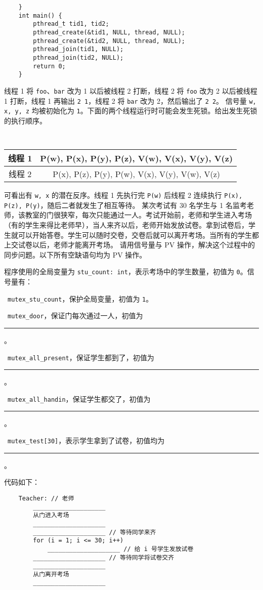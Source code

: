 \begin{problems}
\begin{verbatim}
    }
    int main() {
        pthread_t tid1, tid2;
        pthread_create(&tid1, NULL, thread, NULL);
        pthread_create(&tid2, NULL, thread, NULL);
        pthread_join(tid1, NULL);
        pthread_join(tid2, NULL);
        return 0;
    }
        \end{verbatim}
        \sol 线程 1 将 \verb|foo|、\verb|bar| 改为 1 以后被线程 2 打断，线程 2 将 \verb|foo| 改为 2 以后被线程 1 打断，线程 1 再输出 \verb|2 1|，线程 2 将 \verb|bar| 改为 2，然后输出了 \verb|2 2|。
        \pro 信号量 \verb|w, x, y, z| 均被初始化为 \verb|1|。下面的两个线程运行时可能会发生死锁。给出发生死锁的执行顺序。
        \begin{table}[H]
            \tt
            \centering
            \begin{tabular}{|c|c|}
                \hline
                线程 1 & P(w), P(x), P(y), P(z), V(w), V(x), V(y), V(z) \\ \hline
                线程 2 & P(x), P(z), P(y), P(w), V(x), V(y), V(w), V(z) \\ \hline
            \end{tabular}
        \end{table}
        \sol 可看出有 \verb|w, x| 的潜在反序。线程 1 先执行完 \verb|P(w)| 后线程 2 连续执行 \verb|P(x), P(z), P(y)|，随后二者就发生了相互等待。
        \pro 某次考试有 30 名学生与 1 名监考老师，该教室的门很狭窄，每次只能通过一人。考试开始前，老师和学生进入考场（有的学生来得比老师早），当人来齐以后，老师开始发放试卷。拿到试卷后，学生就可以开始答卷。学生可以随时交卷，交卷后就可以离开考场。当所有的学生都上交试卷以后，老师才能离开考场。
        请用信号量与 PV 操作，解决这个过程中的同步问题。以下所有空缺语句均为 PV 操作。

        程序使用的全局变量为 \verb|stu_count: int|，表示考场中的学生数量，初值为 \verb|0|。信号量有：
        \begin{compactitem}
            \item\ \verb|mutex_stu_count|，保护全局变量，初值为 \verb|1|。
            \item\ \verb|mutex_door|，保证门每次通过一人，初值为 \rule{2.5cm}{0.25mm}。
            \item\ \verb|mutex_all_present|，保证学生都到了，初值为 \rule{2.5cm}{0.25mm}。
            \item\ \verb|mutex_all_handin|，保证学生都交了，初值为 \rule{2.5cm}{0.25mm}。
            \item\ \verb|mutex_test[30]|，表示学生拿到了试卷，初值均为 \rule{2.5cm}{0.25mm}。
        \end{compactitem}
        代码如下：
        \begin{verbatim}
    Teacher: // 老师
        ____________________
        从门进入考场
        ____________________
        ____________________ // 等待同学来齐
        for (i = 1; i <= 30; i++)
            ____________________ // 给 i 号学生发放试卷
        ____________________ // 等待同学将试卷交齐
        ____________________
        从门离开考场
        ____________________


\end{verbatim}
\end{problems}
